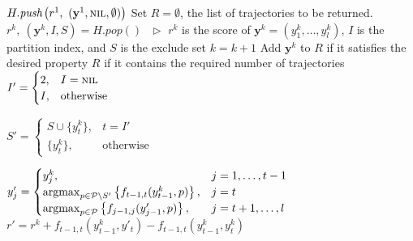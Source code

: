 \begin{algorithm}[htbp]
\begin{algorithmic}[1]
\STATE \vspace{3pt}$H.\textit{push}\left(r^1,~ (\mathbf{y}^1, \textsc{nil}, \emptyset) \right)$
\STATE \vspace{3pt}Set $R=\emptyset$, the list of trajectories to be returned.\vspace{3pt}
    \STATE \vspace{3pt}$r^k,~ (\mathbf{y}^k, I, S) = H.\textit{pop}()~~~ \triangleright$
           $r^k$ is the score of $\mathbf{y}^k=(y_1^k,\dots,y_l^k)$, $I$ is the partition index, and $S$ is the exclude set
    \STATE \vspace{3pt}$k = k + 1$
    \STATE \vspace{3pt}Add $\mathbf{y}^k$ to $R$ if it satisfies the desired property\vspace{3pt}
    \RETURN \vspace{3pt}$R$ if it contains the required number of trajectories
    \STATE \vspace{3pt}$I' = \begin{cases}
                  2, & I = \textsc{nil} \\
                  I, & \text{otherwise}
                 \end{cases}$\vspace{3pt}

        \STATE \vspace{3pt}$S' = \begin{cases}
                      S \cup \{ y_t^k \}, & t = I' \\
                      \{ y_t^k \},        & \text{otherwise}
                     \end{cases}$\vspace{3pt}

        \STATE $y'_j = \begin{cases}
                            y_j^k,                                                                             & j=1,\dots,t-1 \\
                            \operatorname*{argmax}_{p \in \mathcal{P} \setminus S'} \left\{ f_{t-1,t}(y_{t-1}^k, p) \right\}, & j=t \\
                            \operatorname*{argmax}_{p \in \mathcal{P}} \left\{ f_{j-1, j}(y'_{j-1}, p) \right\},              & j=t+1,\dots,l
                \end{cases}$
        \STATE \vspace{3pt}$r' = r^k + f_{t-1,t}(y_{t-1}^k, y'_t) - f_{t-1,t}(y_{t-1}^k, y_t^k)$\vspace{3pt}


\end{algorithmic}
\end{algorithm}
